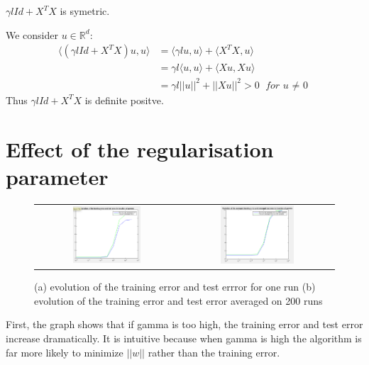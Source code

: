 \documentclass{article} %
\begin{document}
$\gamma l Id +X^{T}X $ is symetric.

We consider $u \in \mathbb{R}^{d}$:
\begin{align*}
\langle (\gamma l Id +X^{T}X)u,u \rangle &= \langle \gamma l u,u \rangle + \langle X^{T}X,u \rangle
\\  &= \gamma l \langle  u,u \rangle + \langle X u, X u \rangle
\\ &= \gamma l ||u||^{2} + ||Xu||^{2} > 0 \textit{ for u $\ne$ 0}
\end{align*}
Thus $\gamma l Id +X^{T}X$ is definite positve. 

\section{Effect of the regularisation parameter}

  \begin{figure}[H]
\center
\begin{tabular}{cc}
\includegraphics[width=0.5\textwidth]{error4}&\includegraphics[width=0.5\textwidth]{averagederror4}
\end{tabular}
\caption{ (a) evolution of the training error and test errror for one run (b) evolution of the training error and test error averaged on 200 runs}
\end{figure}

First, the graph shows that if gamma is too high, the training error and test error increase dramatically. It is intuitive because when gamma is high the algorithm is far more likely to minimize $||w||$  rather than the training error.
\end{document}
